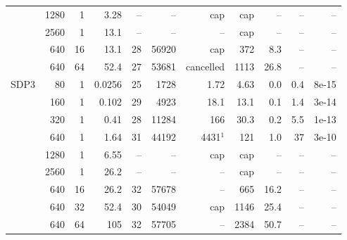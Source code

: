 \begin{tabular}{lrrrrrrrrrr}
 & 1280 & 1 & 3.28 & -- & -- & cap & cap & -- & -- & -- \\
 & 2560 & 1 & 13.1 & -- & -- & -- & cap & -- & -- & -- \\
 & 640 & 16 & 13.1 & 28 & 56920 & cap & 372 & 8.3 & -- & -- \\
 & 640 & 64 & 52.4 & 27 & 53681 & cancelled & 1113 & 26.8 & -- & -- \\
SDP3 & 80 & 1 & 0.0256 & 25 & 1728 & 1.72 & 4.63 & 0.0 & 0.4 & 8e-15 \\
 & 160 & 1 & 0.102 & 29 & 4923 & 18.1 & 13.1 & 0.1 & 1.4 & 3e-14 \\
 & 320 & 1 & 0.41 & 28 & 11284 & 166 & 30.3 & 0.2 & 5.5 & 1e-13 \\
 & 640 & 1 & 1.64 & 31 & 44192 & 4431$^1$ & 121 & 1.0 & 37 & 3e-10 \\
 & 1280 & 1 & 6.55 & -- & -- & cap & cap & -- & -- & -- \\
 & 2560 & 1 & 26.2 & -- & -- & -- & cap & -- & -- & -- \\
 & 640 & 16 & 26.2 & 32 & 57678 & -- & 665 & 16.2 & -- & -- \\
 & 640 & 32 & 52.4 & 30 & 54049 & cap & 1146 & 25.4 & -- & -- \\
 & 640 & 64 & 105 & 32 & 57705 & -- & 2384 & 50.7 & -- & -- \\
\hline
\end{tabular}
